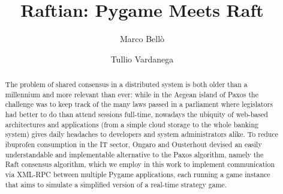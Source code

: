 \documentclass[manuscript,screen,review]{acmart}
\begin{document}
\title{Raftian: Pygame Meets Raft}

\author{Marco Bellò}
\author{Tullio Vardanega}



\renewcommand{\shortauthors}{Bellò and Vardanega}

\begin{abstract}
  The problem of shared consensus in a distributed system is both older than a millennium and more relevant than ever: while in the Aegean island of Paxos the challenge was to keep track of the many laws passed in a parliament where legislators had better to do than attend sessions full-time, nowadays the ubiquity of web-based architectures and applications (from a simple cloud storage to the whole banking system) gives daily headaches to developers and system administrators alike.
  To reduce ibuprofen consumption in the IT sector, Ongaro and Ousterhout devised an easily understandable and implementable alternative to the Paxos algorithm, namely the Raft consensus algorithm, which we employ in this work to implement communication via XML-RPC between multiple Pygame applications, each running a game instance that aims to simulate a simplified version of a real-time strategy game. 
\end{abstract}
\end{document}
